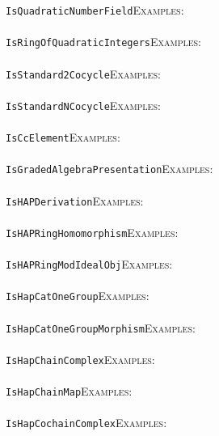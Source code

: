 \documentclass[a4paper,11pt]{report}
\begin{document}
{{ \texttt{IsQuadraticNumberField}{\nobreakspace}{\nobreakspace}{\nobreakspace}{\nobreakspace}\textsc{Examples:} \\
 \\
 \texttt{IsRingOfQuadraticIntegers}{\nobreakspace}{\nobreakspace}{\nobreakspace}{\nobreakspace}\textsc{Examples:} \\
 \\
 \texttt{IsStandard2Cocycle}{\nobreakspace}{\nobreakspace}{\nobreakspace}{\nobreakspace}\textsc{Examples:} \\
 \\
 \texttt{IsStandardNCocycle}{\nobreakspace}{\nobreakspace}{\nobreakspace}{\nobreakspace}\textsc{Examples:} \\
 \\
 \texttt{IsCcElement}{\nobreakspace}{\nobreakspace}{\nobreakspace}{\nobreakspace}\textsc{Examples:} \\
 \\
 \texttt{IsGradedAlgebraPresentation}{\nobreakspace}{\nobreakspace}{\nobreakspace}{\nobreakspace}\textsc{Examples:} \\
 \\
 \texttt{IsHAPDerivation}{\nobreakspace}{\nobreakspace}{\nobreakspace}{\nobreakspace}\textsc{Examples:} \\
 \\
 \texttt{IsHAPRingHomomorphism}{\nobreakspace}{\nobreakspace}{\nobreakspace}{\nobreakspace}\textsc{Examples:} \\
 \\
 \texttt{IsHAPRingModIdealObj}{\nobreakspace}{\nobreakspace}{\nobreakspace}{\nobreakspace}\textsc{Examples:} \\
 \\
 \texttt{IsHapCatOneGroup}{\nobreakspace}{\nobreakspace}{\nobreakspace}{\nobreakspace}\textsc{Examples:} \\
 \\
 \texttt{IsHapCatOneGroupMorphism}{\nobreakspace}{\nobreakspace}{\nobreakspace}{\nobreakspace}\textsc{Examples:} \\
 \\
 \texttt{IsHapChainComplex}{\nobreakspace}{\nobreakspace}{\nobreakspace}{\nobreakspace}\textsc{Examples:} \\
 \\
 \texttt{IsHapChainMap}{\nobreakspace}{\nobreakspace}{\nobreakspace}{\nobreakspace}\textsc{Examples:} \\
 \\
 \texttt{IsHapCochainComplex}{\nobreakspace}{\nobreakspace}{\nobreakspace}{\nobreakspace}\textsc{Examples:} \\
}}
\end{document}
